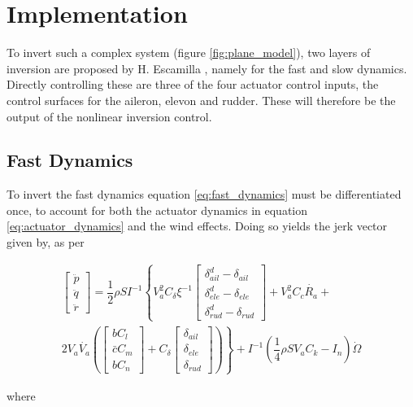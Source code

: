 \section{Implementation}
\label{sec:imple}
To invert such a complex system (figure \ref{fig:plane_model}), two layers of inversion are proposed by H. Escamilla \cite{hector}, namely for the fast and slow dynamics. Directly controlling these are three of the four actuator control inputs, the control surfaces for the aileron, elevon and rudder. These will therefore be the output of the nonlinear inversion control. 

\subsection{Fast Dynamics}
To invert the fast dynamics equation \ref{eq:fast_dynamics} must be differentiated once, to account for both the actuator dynamics in equation \ref{eq:actuator_dynamics} and the wind effects. Doing so yields the jerk vector given by, as per \cite{hector}

\begin{equation}
\begin{split}
\begin{bmatrix}
\ddot{p}\\
\ddot{q}\\
\ddot{r}
\end{bmatrix}
= \dfrac{1}{2}\rho SI^{-1} \left\lbrace V_a^2 C_\delta \xi^{-1}
\begin{bmatrix}
\delta^d_{ail}-\delta_{ail}\\
\delta^d_{ele}-\delta_{ele}\\
\delta^d_{rud}-\delta_{rud}
\end{bmatrix}
+V_a^2C_c\dot{R_a}+\right.\\
\left. 2V_a\dot{V_a}\left(
\begin{bmatrix}
bC_l\\
\bar{c}C_m\\
bC_n
\end{bmatrix}
+ C_\delta 
\begin{bmatrix}
\delta_{ail}\\
\delta_{ele}\\
\delta_{rud}
\end{bmatrix}
\right) \right \rbrace + I^{-1}\left(\dfrac{1}{4}\rho SV_aC_k-I_n\right)\dot{\Omega}
\label{eq:jerk}
\end{split}
\end{equation}

where

